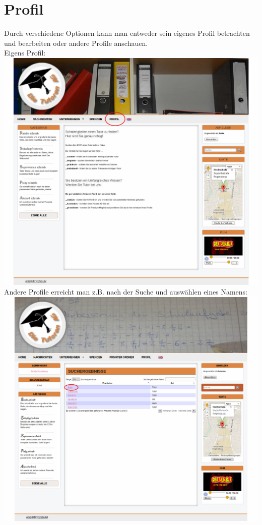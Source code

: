 \section{Profil}
Durch verschiedene Optionen kann man entweder sein eigenes Profil betrachten und bearbeiten oder andere Profile anschauen.\\
Eigens Profil:\\
\includegraphics[width=1\textwidth]{../Screenshots/de/Startseite_profile_change}
\newpage
Andere Profile erreicht man z.B. nach der Suche und auswählen eines Namens:\\
\includegraphics[width=1\textwidth]{../Screenshots/de/Suchergebnisse-profile-doku}

